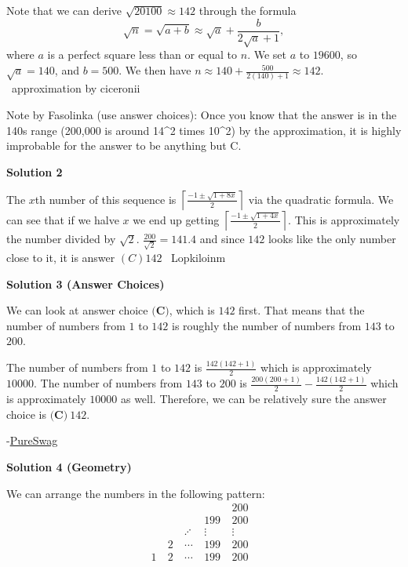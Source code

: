 \begin{enumerate}
 Note that we can derive $\sqrt{20100} \approx 142$ through the formula 
 \[\sqrt{n} = \sqrt{a+b} \approx \sqrt{a} + \frac{b}{2\sqrt{a} + 1},\]where $a$ is a perfect square less than or equal to $n$. We set $a$ to $19600$, so $\sqrt{a} = 140$, and $b = 500$. We then have $n \approx 140 + \frac{500}{2(140)+1} \approx 142$. ~approximation by ciceronii

 Note by Fasolinka (use answer choices): Once you know that the answer is in the 140s range (200,000 is around 14\textasciicircum{}2 times 10\textasciicircum{}2) by the approximation, it is highly improbable for the answer to be anything but C.

 



\textbf{Solution 2}

The $x$th number of this sequence is $\left\lceil\frac{-1\pm\sqrt{1+8x}}{2}\right\rceil$ via the quadratic formula. We can see that if we halve $x$ we end up getting $\left\lceil\frac{-1\pm\sqrt{1+4x}}{2}\right\rceil$. This is approximately the number divided by $\sqrt{2}$. $\frac{200}{\sqrt{2}} = 141.4$ and since $142$ looks like the only number close to it, it is answer $\boxed{(C) 142}$ ~Lopkiloinm

 



\textbf{Solution 3 (Answer Choices)}

We can look at answer choice $\textbf{(C)}$, which is $142$ first. That means that the number of numbers from $1$ to $142$ is roughly the number of numbers from $143$ to $200$.

 The number of numbers from $1$ to $142$ is $\frac{142(142+1)}{2}$ which is approximately $10000.$ The number of numbers from $143$ to $200$ is $\frac{200(200+1)}{2}-\frac{142(142+1)}{2}$ which is approximately $10000$ as well. Therefore, we can be relatively sure the answer choice is $\boxed{\textbf{(C)} ~142}.$

 -\href{https://artofproblemsolving.com/wiki/index.php?title=User:PureSwag}{PureSwag}

 



\textbf{Solution 4 (Geometry)}

We can arrange the numbers in the following pattern:
 \[ \begin{array}{cccccc} \ &\ &\ &\ &\ 200 & \\ \ &\ &\ &\ 199 & \ 200 & \\ \ &\ &\ \iddots& \ \vdots& \ \vdots& \\ \ &\ 2& \ \cdots& \ 199& \ 200& \\ 1 & \ 2 & \ \cdots& \ 199& \ 200& \end{array} \]


\end{enumerate}
